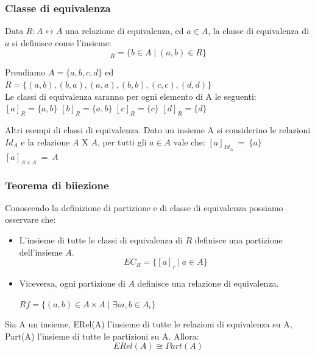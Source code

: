 \subsubsection{Classe di equivalenza}
\begin{definition}
    Data $R: A \leftrightarrow A$ una relazione di equivalenza, ed $a \in A$, la classe di equivalenza di $a$ si definisce come l'insieme: 
    \begin{equation}
        [a]_R = \{b \in A \mid (a,b) \in R\}
    \end{equation}
\end{definition}
\begin{example}
    Prendiamo $A = \{a,b,c,d\}$ ed $R = \{(a,b), (b,a), (a,a), (b,b), (c,c), (d,d)\}$\\
    Le classi di equivalenza saranno per ogni elemento di A le seguenti:\\
    $[a]_R = \{a,b\}$ \hspace{.5cm} $[b]_R = \{a,b\}$ \hspace{.5cm} $[c]_R = \{c\}$ \hspace{.5cm} $[d]_R = \{d\}$
\end{example}
\begin{example}
    Altri esempi di classi di equivalenza. Dato un insieme A si considerino le relazioni $Id_A$ e la relazione $A$ X $A$, per tutti gli $a \in A$ vale che: \: \: \:
    $[a]_{Id_A} \: = \: \{a\}$ \hspace{.7cm} $[a]_{A \times A} \: = \: A$
\end{example}

\subsubsection{Teorema di biiezione}
Conoscendo la definizione di partizione e di classe di equivalenza possiamo osservare che:
\begin{itemize}
    \item L'insieme di tutte le classi di equivalenza di $R$ definisce una partizione dell'insieme $A$.
    \[EC_R = \{[a]_r \:|\: a \in A\}\]
    \item Viceversa, ogni partizione di $A$ definisce una relazione di equivalenza.
    \begin{center}
        $Rf = \{(a,b) \in A \times A \mid \exists i a,b \in A_i\}$
    \end{center}
\end{itemize}

\begin{theorem}
    Sia A un insieme, ERel(A) l'insieme di tutte le relazioni di equivalenza su A, Part(A) l'insieme di tutte le partizioni su A. Allora:
    \begin{equation}
        ERel(A) \cong Part(A)
    \end{equation}
\end{theorem}

